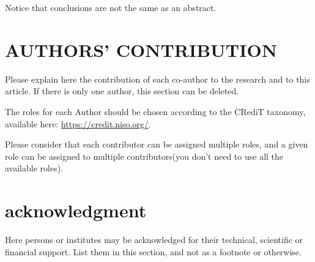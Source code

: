 \documentclass[final]{imeko_acta}
\begin{document}
Notice that conclusions are not the same as an abstract.

\section{AUTHORS' CONTRIBUTION}

Please explain here the contribution of each co-author to the
research and to this article. If there is only one author, this
section can be deleted.

The roles for each Author should be chosen according to the
CRediT taxonomy, available here: \url{https://credit.niso.org/}.

Please consider that each contributor can be assigned
multiple roles, and a given role can be assigned to multiple
contributors(you don't need to use all the available roles).

\section*{acknowledgment} 

Here persons or institutes may be acknowledged for their technical, scientific or financial support. List them in this section, and not as a footnote or otherwise.



\end{document}
